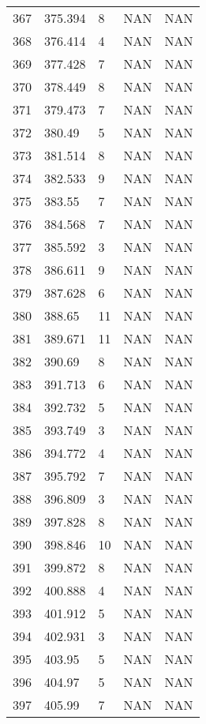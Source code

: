 \documentclass{article}
\begin{document}
\begin{longtable}{@{}lllll@{}}
				367 & 375.394 & 8     & NAN   & NAN   \\
				368 & 376.414 & 4     & NAN   & NAN   \\
				369 & 377.428 & 7     & NAN   & NAN   \\
				370 & 378.449 & 8     & NAN   & NAN   \\
				371 & 379.473 & 7     & NAN   & NAN   \\
				372 & 380.49  & 5     & NAN   & NAN   \\
				373 & 381.514 & 8     & NAN   & NAN   \\
				374 & 382.533 & 9     & NAN   & NAN   \\
				375 & 383.55  & 7     & NAN   & NAN   \\
				376 & 384.568 & 7     & NAN   & NAN   \\
				377 & 385.592 & 3     & NAN   & NAN   \\
				378 & 386.611 & 9     & NAN   & NAN   \\
				379 & 387.628 & 6     & NAN   & NAN   \\
				380 & 388.65  & 11    & NAN   & NAN   \\
				381 & 389.671 & 11    & NAN   & NAN   \\
				382 & 390.69  & 8     & NAN   & NAN   \\
				383 & 391.713 & 6     & NAN   & NAN   \\
				384 & 392.732 & 5     & NAN   & NAN   \\
				385 & 393.749 & 3     & NAN   & NAN   \\
				386 & 394.772 & 4     & NAN   & NAN   \\
				387 & 395.792 & 7     & NAN   & NAN   \\
				388 & 396.809 & 3     & NAN   & NAN   \\
				389 & 397.828 & 8     & NAN   & NAN   \\
				390 & 398.846 & 10    & NAN   & NAN   \\
				391 & 399.872 & 8     & NAN   & NAN   \\
				392 & 400.888 & 4     & NAN   & NAN   \\
				393 & 401.912 & 5     & NAN   & NAN   \\
				394 & 402.931 & 3     & NAN   & NAN   \\
				395 & 403.95  & 5     & NAN   & NAN   \\
				396 & 404.97  & 5     & NAN   & NAN   \\
				397 & 405.99  & 7     & NAN   & NAN   \\

\end{longtable}
\end{document}
